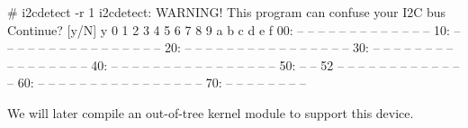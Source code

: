 \begin{bashinput}
# i2cdetect -r 1
i2cdetect: WARNING! This program can confuse your I2C bus
Continue? [y/N] y
     0  1  2  3  4  5  6  7  8  9  a  b  c  d  e  f
00:          -- -- -- -- -- -- -- -- -- -- -- -- --
10: -- -- -- -- -- -- -- -- -- -- -- -- -- -- -- --
20: -- -- -- -- -- -- -- -- -- -- -- -- -- -- -- --
30: -- -- -- -- -- -- -- -- -- -- -- -- -- -- -- --
40: -- -- -- -- -- -- -- -- -- -- -- -- -- -- -- --
50: -- -- 52 -- -- -- -- -- -- -- -- -- -- -- -- --
60: -- -- -- -- -- -- -- -- -- -- -- -- -- -- -- --
70: -- -- -- -- -- -- -- --
\end{bashinput}

We will later compile an out-of-tree kernel module to support this device.
